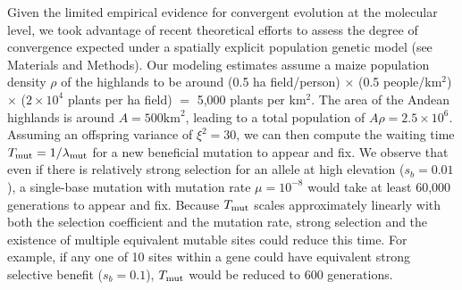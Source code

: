 Given the limited empirical evidence for convergent evolution at the molecular level, we took advantage of recent theoretical efforts \cite[]{ralph2014convergent} to assess the degree of convergence expected under a spatially explicit population genetic model (see Materials and Methods).
Our modeling estimates assume a maize population density $\rho$ of the highlands to be around (0.5 ha field/person) $\times$ (0.5 people/km$^2$) $\times$ ($2\times 10^4$ plants per ha field) $=$ 5,000 plants per km$^2$.
The area of the Andean highlands is around $A=500\text{km}^2$, leading to a total population of $A \rho = 2.5 \times 10^6$. 
Assuming an offspring variance of $\xi^2 = 30$, we can then compute the waiting time $T_{\text{mut}}=1/\lambda_{\text{mut}}$ for a new beneficial mutation to appear and fix.
We observe that even if there is relatively strong selection for an allele at high elevation ($s_b=0.01$), a single-base mutation with mutation rate $\mu=10^{-8}$ would take at least 60,000 generations to appear and fix.
Because $T_{\text{mut}}$ scales approximately linearly with both the selection coefficient and the mutation rate, strong selection and the existence of multiple equivalent mutable sites could reduce this time. 
For example, if any one of 10 sites within a gene could have equivalent strong selective benefit ($s_b=0.1$), $T_{\text{mut}}$ would be reduced to 600 generations. 


